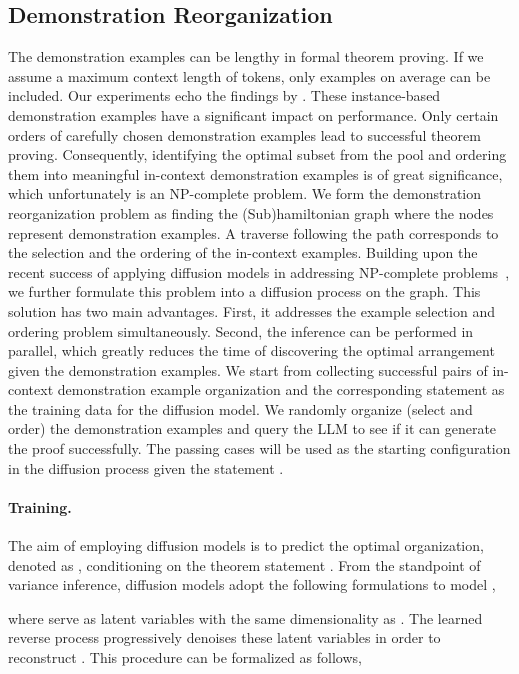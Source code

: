 \documentclass{article}
\begin{document}
\subsection{Demonstration Reorganization}
\label{sec:diffusion-based organization}
The demonstration examples can be lengthy in formal theorem proving. If we assume a maximum context length of  tokens, only  examples on average can be included. Our experiments echo the findings by \citet{wu2022self}. These instance-based demonstration examples have a significant impact on performance. Only certain orders of carefully chosen demonstration examples lead to successful theorem proving. Consequently, identifying the optimal subset from the pool and ordering them into meaningful in-context demonstration examples is of great significance, which unfortunately is an NP-complete problem. We form the demonstration reorganization problem as finding the (Sub)hamiltonian graph where the nodes represent demonstration examples. A traverse following the path corresponds to the selection and the ordering of the in-context examples.
Building upon the recent success of applying diffusion models in addressing NP-complete problems~\cite{graikos2022diffusion,sun2023difusco}, we further formulate this problem into a diffusion process on the graph. This solution has two main advantages. First, it addresses the example selection and ordering problem simultaneously. Second, the inference can be performed in parallel, which greatly reduces the time of discovering the optimal arrangement given the demonstration examples. We start from collecting successful pairs of in-context demonstration example organization and the corresponding statement  as the training data for the diffusion model. We randomly organize (select and order) the demonstration examples and query the LLM to see if it can generate the proof successfully. The passing cases will be used as the starting configuration  in the diffusion process given the statement .

\paragraph{Training.}
The aim of employing diffusion models is to predict the optimal organization, denoted as , conditioning on the theorem statement .
From the standpoint of variance inference, diffusion models adopt the following formulations to model ,

where  serve as latent variables with the same dimensionality as .
The learned reverse process progressively denoises these latent variables in order to reconstruct . This procedure can be formalized as follows,
\end{document}
